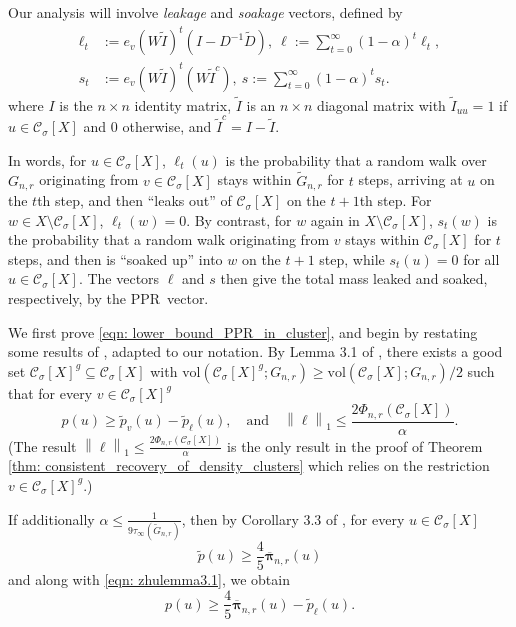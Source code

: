 \documentclass[11pt,twoside]{article}
\newcommand{\vol}{\mathrm{vol}}
\newcommand{\norm}[1]{\left\lVert#1\right\rVert}
\newcommand{\1}{\mathbf{1}}
\newcommand{\pbf}{p}        %
\newcommand{\pibf}{\bm{\pi}}
\newcommand{\Xbf}{X}             %
\newcommand{\Wbf}{W}
\newcommand{\Dbf}{D}
\newcommand{\Cset}{\mathcal{C}}
\newcommand{\Csig}{\Cset_{\sigma}}
\newcommand{\pprspace}{{\sc PPR~}}
\newcommand{\wDbf}{\widetilde{\Dbf}}
\begin{document}
	Our analysis will involve \emph{leakage} and \emph{soakage} vectors, defined by
	\begin{align}
	\label{eqn: leakage_soakage}
	\ell_t & := e_v (\Wbf \widetilde{I} )^t (I - \Dbf^{-1} \wDbf),~ \ell := \sum_{t = 0}^{\infty} (1 - \alpha)^t \ell_t, \nonumber \\
	s_t & := e_v (\Wbf \widetilde{I} )^t (\Wbf \widetilde{I}^c),~ s := \sum_{t = 0}^{\infty} (1 - \alpha)^{t} s_t.
	\end{align}
	where $I$ is the $n \times n$ identity matrix, $\widetilde{I}$ is an $n \times n$ diagonal matrix with $\widetilde{I}_{uu} = 1$ if $u \in \Csig[\Xbf]$ and $0$ otherwise, and $\widetilde{I}^c = I - \widetilde{I}$.
	
	In words, for $u \in \Csig[\Xbf]$, $\ell_t(u)$ is the probability that a random walk over $G_{n,r}$ originating from $v \in \Csig[\Xbf]$ stays within $\widetilde{G}_{n,r}$ for $t$ steps, arriving at $u$ on the $t$th step, and then ``leaks out'' of $\Csig[\Xbf]$ on the $t + 1$th step. For $w \in \Xbf \setminus \Csig[\Xbf]$, $\ell_t(w) = 0$. By contrast, for $w$ again in $\Xbf \setminus \Csig[\Xbf]$, $s_t(w)$ is the probability that a random walk originating from $v$ stays within $\Csig[\Xbf]$ for $t$ steps, and then is ``soaked up'' into $w$ on the $t + 1$ step, while $s_t(u) = 0$ for all $u \in \Csig[\Xbf]$. The vectors $\ell$ and $s$ then give the total mass leaked and soaked, respectively, by the \pprspace vector. 
	
	We first prove \eqref{eqn: lower_bound_PPR_in_cluster}, and begin by restating some results of \citep{zhu2013}, adapted to our notation. By Lemma 3.1 of \citep{zhu2013}, there exists a good set $\Csig[\Xbf]^g \subseteq \Csig[\Xbf]$ with $\vol(\Csig[\Xbf]^g; G_{n,r}) \geq \vol(\Csig[\Xbf]; G_{n,r})/2$ such that for every $v \in \Csig[\Xbf]^g$
	\begin{equation}
	\label{eqn: zhulemma3.1}
	\pbf(u) \geq \widetilde{\pbf}_v(u) - \widetilde{\pbf}_{\ell}(u), \quad \textrm{and} \quad \norm{\ell}_1 \leq \frac{2 \Phi_{n,r}(\Csig[\Xbf])}{\alpha}.
	\end{equation}
	(The result $\norm{\ell}_1 \leq \frac{2 \Phi_{n,r}(\Csig[\Xbf])}{\alpha}$ is the only result in the proof of Theorem \ref{thm: consistent_recovery_of_density_clusters} which relies on the restriction $v \in \Csig[\Xbf]^g$.)
	
	If additionally $\alpha \leq \frac{1}{9\tau_{\infty}(\widetilde{G}_{n,r})}$, then by Corollary 3.3 of \citep{zhu2013}, for every $u \in \Csig[\Xbf]$
	\begin{equation*}
	\widetilde{\pbf}(u) \geq \frac{4}{5} \overline{\pibf}_{n,r}(u)
	\end{equation*}
	and along with \eqref{eqn: zhulemma3.1}, we obtain
	\begin{equation*}
	\pbf(u) \geq \frac{4}{5} \overline{\pibf}_{n,r}(u) - \widetilde{\pbf}_{\ell}(u).
	\end{equation*}
	
\end{document}
